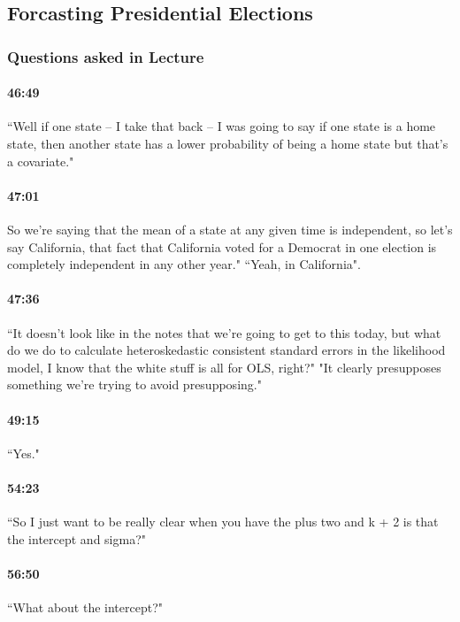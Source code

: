 \documentclass[11pt]{article}
\begin{document}
\subsection{Forcasting Presidential Elections}
\subsubsection{Questions asked in Lecture}
\paragraph{46:49}  ``Well if one state -- I take that back -- I was going to say if one state is a home state, then another state has a lower probability of being a home state but that's a covariate."
\paragraph{47:01} So we're saying that the mean of a state at any given time is independent, so let's say California, that fact that California voted for a Democrat in one election is completely independent in any other year."  ``Yeah, in California".
\paragraph{47:36} ``It doesn't look like in the notes that we're going to get to this today, but what do we do to calculate heteroskedastic consistent standard errors in the likelihood model,  I know that the white stuff is all for OLS, right?"  "It clearly presupposes something we're trying to avoid presupposing." 
\paragraph{49:15} ``Yes."
\paragraph{54:23} ``So I just want to be really clear when you have the plus two and k + 2 is that the intercept and sigma?"
\paragraph{56:50} ``What about the intercept?"
\end{document}
